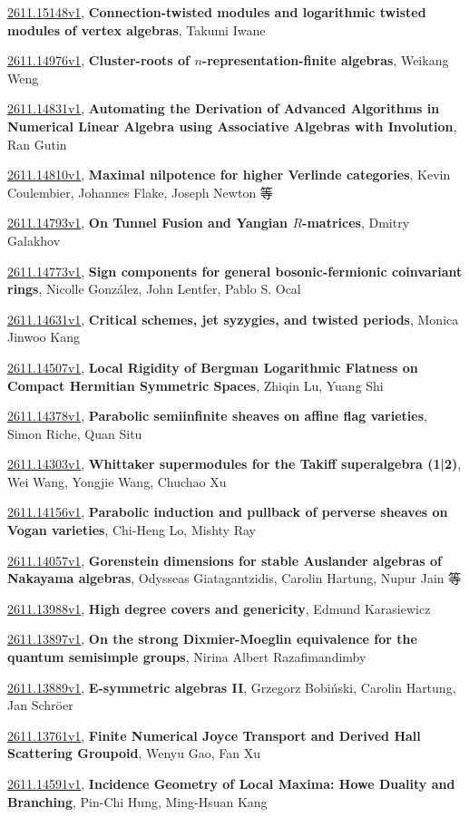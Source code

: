 \documentclass[9pt, a4paper]{article}
\theoremstyle{plain}
\theoremstyle{definition}
\theoremstyle{remark}
\newcommand{\arxiv}[3]{\href{https://arxiv.org/abs/#1}{#1}, \textbf{\textcolor{arxivblue}{#2}}, #3}
\begin{document}
\arxiv{2611.15148v1}{Connection-twisted modules and logarithmic twisted modules of vertex algebras}{Takumi Iwane}

\arxiv{2611.14976v1}{Cluster-roots of $n$-representation-finite algebras}{Weikang Weng}

\arxiv{2611.14831v1}{Automating the Derivation of Advanced Algorithms in Numerical Linear Algebra using Associative Algebras with Involution}{Ran Gutin}

\arxiv{2611.14810v1}{Maximal nilpotence for higher Verlinde categories}{Kevin Coulembier, Johannes Flake, Joseph Newton 等}

\arxiv{2611.14793v1}{On Tunnel Fusion and Yangian $R$-matrices}{Dmitry Galakhov}

\arxiv{2611.14773v1}{Sign components for general bosonic-fermionic coinvariant rings}{Nicolle González, John Lentfer, Pablo S. Ocal}

\arxiv{2611.14631v1}{Critical schemes, jet syzygies, and twisted periods}{Monica Jinwoo Kang}

\arxiv{2611.14507v1}{Local Rigidity of Bergman Logarithmic Flatness on Compact Hermitian Symmetric Spaces}{Zhiqin Lu, Yuang Shi}

\arxiv{2611.14378v1}{Parabolic semiinfinite sheaves on affine flag varieties}{Simon Riche, Quan Situ}

\arxiv{2611.14303v1}{Whittaker supermodules for the Takiff superalgebra \mathfrak{osp}(1|2)}{Wei Wang, Yongjie Wang, Chuchao Xu}

\arxiv{2611.14156v1}{Parabolic induction and pullback of perverse sheaves on Vogan varieties}{Chi-Heng Lo, Mishty Ray}

\arxiv{2611.14057v1}{Gorenstein dimensions for stable Auslander algebras of Nakayama algebras}{Odysseas Giatagantzidis, Carolin Hartung, Nupur Jain 等}

\arxiv{2611.13988v1}{High degree covers and genericity}{Edmund Karasiewicz}

\arxiv{2611.13897v1}{On the strong Dixmier-Moeglin equivalence for the quantum semisimple groups}{Nirina Albert Razafimandimby}

\arxiv{2611.13889v1}{E-symmetric algebras II}{Grzegorz Bobiński, Carolin Hartung, Jan Schröer}

\arxiv{2611.13761v1}{Finite Numerical Joyce Transport and Derived Hall Scattering Groupoid}{Wenyu Gao, Fan Xu}

\arxiv{2611.14591v1}{Incidence Geometry of Local Maxima: Howe Duality and Branching}{Pin-Chi Hung, Ming-Hsuan Kang}
\end{document}
